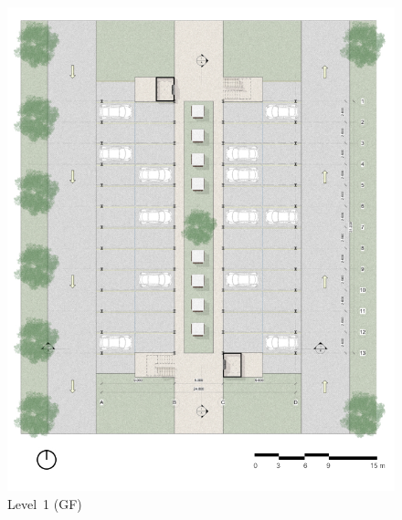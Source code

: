 ﻿%
\begin{figure}[H]
	\centering
	\includegraphics[width=\linewidth]{src/graphics/container-village--level-01.jpg}
	\caption*{%
		Level~1 (GF)
	}
	\label{
		fig:container-village--level-01
	}
\end{figure}
